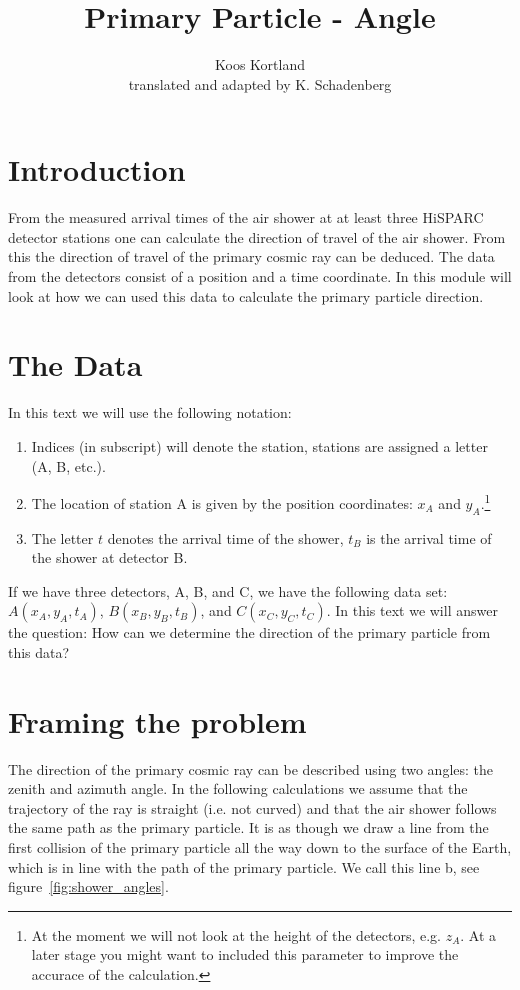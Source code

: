 


\author{Koos Kortland \\ translated and adapted by K. Schadenberg}
\date{}
\title{Primary Particle - Angle}



\maketitle

\section{Introduction}
From the measured arrival times of the air shower at at least three HiSPARC detector stations one can calculate the direction of travel of the air shower. From this the direction of travel of the primary cosmic ray can be deduced. The data from the detectors consist of a position and a time coordinate. In this module will look at how we can used this data to calculate the primary particle direction.

\section{The Data}
In this text we will use the following notation:
\begin{enumerate}[-]
\item Indices (in subscript) will denote the station, stations are assigned a letter (A, B, etc.).
\item The location of station A is given by the position coordinates: $x_A$ and $y_A$.\footnote{At the moment we will not look at the height of the detectors, e.g. $z_A$. At a later stage you might want to included this parameter to improve the accurace of the calculation.}
\item The letter $t$ denotes the arrival time of the shower, $t_B$ is the arrival time of the shower at detector B.
\end{enumerate}
If we have three detectors, A, B, and C, we have the following data set: $A(x_A, y_A, t_A)$, $B(x_B, y_B, t_B)$, and $C(x_C, y_C, t_C)$. In this text we will answer the question: How can we determine the direction of the primary particle from this data?

\section{Framing the problem}
The direction of the primary cosmic ray can be described using two angles: the zenith and azimuth angle. In the following calculations we assume that the trajectory of the ray is straight (i.e. not curved) and that the air shower follows the same path as the primary particle. It is as though we draw a line from the first collision of the primary particle all the way down to the surface of the Earth, which is in line with the path of the primary particle. We call this line b, see figure~\ref{fig:shower_angles}.

